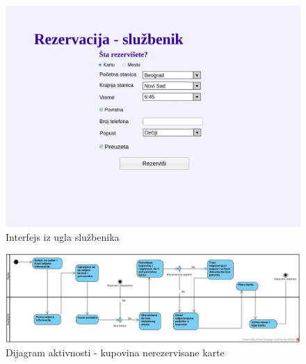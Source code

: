 \clearpage
\begin{figure}[h!tb] 
	\centering
	\includegraphics[width=1.2\linewidth]{../Slike/Veb/rezervacija_sluzbenik.png}
	\caption{Interfejs iz ugla slu\v zbenika}
	\label {fig:rezervacijasluzbenik}
\end{figure}
\begin{figure}[h!tb] 
	\includegraphics[width=1.2\linewidth]{"../Slike/kupovina"}
	\caption{Dijagram aktivnosti - kupovina nerezervisane karte}
	\label{fig:kupovina}
\end{figure}

